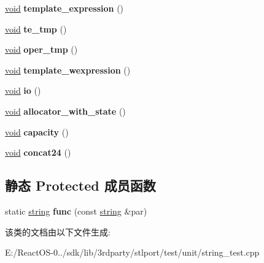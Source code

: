 \begin{DoxyCompactItemize}
\hyperlink{interfacevoid}{void} {\bfseries template\+\_\+expression} ()
\item 
\mbox{\label{class_string_test_a1563fce8c34d7e568be484e924e6fc6e}} 
\hyperlink{interfacevoid}{void} {\bfseries te\+\_\+tmp} ()
\item 
\mbox{\label{class_string_test_a93b059564f16888317c53415cbf6eec0}} 
\hyperlink{interfacevoid}{void} {\bfseries oper\+\_\+tmp} ()
\item 
\mbox{\label{class_string_test_aaba96abf2104a8934f763134325d6548}} 
\hyperlink{interfacevoid}{void} {\bfseries template\+\_\+wexpression} ()
\item 
\mbox{\label{class_string_test_af8d12b9c5c9fe1b46fefaa68d28f590e}} 
\hyperlink{interfacevoid}{void} {\bfseries io} ()
\item 
\mbox{\label{class_string_test_a165b2d672bafe86258757bd30069e30d}} 
\hyperlink{interfacevoid}{void} {\bfseries allocator\+\_\+with\+\_\+state} ()
\item 
\mbox{\label{class_string_test_afc177db9173e6faf8563fa11b82c8b08}} 
\hyperlink{interfacevoid}{void} {\bfseries capacity} ()
\item 
\mbox{\label{class_string_test_a2811aff5a68ec6e663dfa6af6e53e7c7}} 
\hyperlink{interfacevoid}{void} {\bfseries concat24} ()
\end{DoxyCompactItemize}
\subsection*{静态 Protected 成员函数}
\begin{DoxyCompactItemize}
\item 
\mbox{\label{class_string_test_a15a6a17ebdebc3b25bec5615f82f6be0}} 
static \hyperlink{structstring}{string} {\bfseries func} (const \hyperlink{structstring}{string} \&par)
\end{DoxyCompactItemize}


该类的文档由以下文件生成\+:\begin{DoxyCompactItemize}
\item 
E\+:/\+React\+O\+S-\/0../sdk/lib/3rdparty/stlport/test/unit/string\+\_\+test.\+cpp\end{DoxyCompactItemize}
